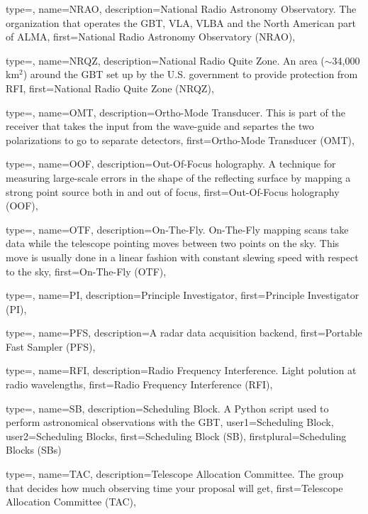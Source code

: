 {
  type=\acronymtype,
  name={NRAO},
  description={National Radio Astronomy Observatory.
The organization that operates the GBT, VLA, VLBA and 
the North American part of ALMA},
  first={National Radio Astronomy Observatory (NRAO)},
}

{
  type=\acronymtype,
  name={NRQZ},
  description={National Radio Quite Zone.
An area ($\sim$34,000 km$^2$) around the GBT set up by the
U.S. government to provide protection from RFI},
  first={National Radio Quite Zone (NRQZ)},
}

{
  type=\acronymtype,
  name={OMT},
  description={Ortho-Mode Transducer.
This is part of the receiver that takes the input from the 
wave-guide and separtes the two polarizations to go to separate detectors},
  first={Ortho-Mode Transducer (OMT)},
}

{
  type=\acronymtype,
  name={OOF},
  description={Out-Of-Focus holography.
A technique for measuring large-scale errors in the shape of the
reflecting surface by mapping a strong point source both in and out of focus},
  first={Out-Of-Focus holography (OOF)},
}

{
  type=\acronymtype,
  name={OTF},
  description={On-The-Fly.
On-The-Fly mapping scans take data while the telescope pointing
moves between two points on the sky.  This move is usually done in a linear
fashion with constant slewing speed with respect to the sky},
  first={On-The-Fly (OTF)},
}

{
  type=\acronymtype,
  name={PI},
  description={Principle Investigator},
  first={Principle Investigator (PI)},
} 

{
  type=\acronymtype,
  name={PFS},
  description={A radar data acquisition backend},
  first={Portable Fast Sampler (PFS)},
} 

{
  type=\acronymtype,
  name={RFI},
  description={Radio Frequency Interference.
Light polution at radio wavelengths},
  first={Radio Frequency Interference (RFI)},
} 

{
  type=\acronymtype,
  name={SB},
  description={Scheduling Block. A Python script used to perform astronomical
               observations with the GBT},
  user1={Scheduling Block},
  user2={Scheduling Blocks},
  first={Scheduling Block (SB)},
  firstplural={Scheduling Blocks (SBs)}
} 

{
  type=\acronymtype,
  name={TAC},
  description={Telescope Allocation Committee.
The group that decides how much observing time your proposal 
will get},
  first={Telescope Allocation Committee (TAC)},
}

